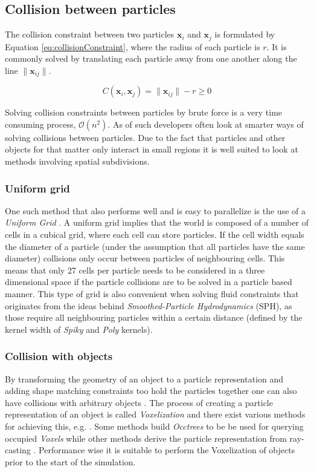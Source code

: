 \subsection{Collision between particles}

The collision constraint between two particles $ \mathbf{x}_{i} $ and $ \mathbf{x}_{j} $ is formulated by Equation \ref{eq:collisionConstraint}, where the radius of each particle is $ r $. It is commonly solved by translating each particle away from one another along the line $ \| \mathbf{x}_{ij} \| $.

\begin{equation} \label{eq:collisionConstraint}
  C(\mathbf{x}_{i}, \mathbf{x}_{j}) = \| \mathbf{x}_{ij} \| - r \geq 0 
\end{equation}

Solving collision constraints between particles by brute force is a very time consuming process, $\mathcal{O}(n^{2})$. As of such developers often look at smarter ways of solving collisions between particles. Due to the fact that particles and other objects for that matter only interact in small regions it is well suited to look at methods involving spatial subdivisions. 

\subsubsection{Uniform grid}

One such method that also performs well and is easy to parallelize is the use of a \textit{Uniform Grid} \cite{Green}. A uniform grid implies that the world is composed of a number of cells in a cubical grid, where each cell can store particles. If the cell width equals the diameter of a particle (under the assumption that all particles have the same diameter) collisions only occur between particles of neighbouring cells. This means that only 27 cells per particle needs to be considered in a three dimensional space if the particle collisions are to be solved in a particle based manner. This type of grid is also convenient when solving fluid constraints that originates from the ideas behind \textit{Smoothed-Particle Hydrodynamics} (SPH), as those require all neighbouring particles within a certain distance (defined by the kernel width of \textit{Spiky} and \textit{Poly} kernels).

\subsubsection{Collision with objects}

By transforming the geometry of an object to a particle representation and adding shape matching constraints too hold the particles together one can also have collisions with arbitrary objects \cite{muller2005meshless, macklin2014unified}. The process of creating a particle representation of an object is called \textit{Voxelization} and there exist various methods for achieving this, e.g. \cite{VoxPolygon, VoxSingle}. Some methods build \textit{Occtrees} to be be used for querying occupied \textit{Voxels} while other methods derive the particle representation from ray-casting \cite{VoxSingle}. Performance wise it is suitable to perform the Voxelization of objects prior to the start of the simulation.